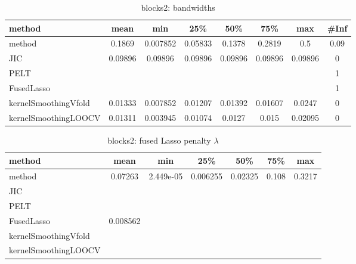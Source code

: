 \begin{table}[ht]
\centering
\begin{tabular}{l|c|ccccc|c}
  \hline
method & mean & min & 25\% & 50\% & 75\% & max & \#Inf \\ 
  \hline
method & 0.1869 & 0.007852 & 0.05833 & 0.1378 & 0.2819 &   0.5 & 0.09 \\ 
  JIC & 0.09896 & 0.09896 & 0.09896 & 0.09896 & 0.09896 & 0.09896 &   0 \\ 
  PELT &  &  &  &  &  &  &   1 \\ 
  FusedLasso &  &  &  &  &  &  &   1 \\ 
  kernelSmoothingVfold & 0.01333 & 0.007852 & 0.01207 & 0.01392 & 0.01607 & 0.0247 &   0 \\ 
  kernelSmoothingLOOCV & 0.01311 & 0.003945 & 0.01074 & 0.0127 & 0.015 & 0.02095 &   0 \\ 
   \hline
\end{tabular}
\caption{blocks2: bandwidths} 
\label{tab:blocks2Bandwidths}
\end{table}
\begin{table}[ht]
\centering
\begin{tabular}{l|c|ccccc}
  \hline
method & mean & min & 25\% & 50\% & 75\% & max \\ 
  \hline
method & 0.07263 & 2.449e-05 & 0.006255 & 0.02325 & 0.108 & 0.3217 \\ 
  JIC &  &  &  &  &  &  \\ 
  PELT &  &  &  &  &  &  \\ 
  FusedLasso & 0.008562 &  &  &  &  &  \\ 
  kernelSmoothingVfold &  &  &  &  &  &  \\ 
  kernelSmoothingLOOCV &  &  &  &  &  &  \\ 
   \hline
\end{tabular}
\caption{blocks2: fused Lasso penalty $\lambda$} 
\label{tab:blocks2Lambdas}
\end{table}
